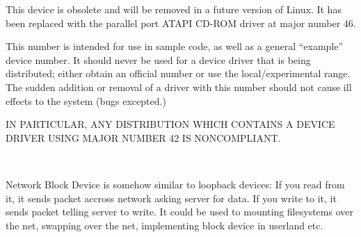 \noindent
This device is obsolete and will be removed in a future version of
Linux.  It has been replaced with the parallel port ATAPI CD-ROM
driver at major number 46.

\begin{devicelist}
\end{devicelist}

\noindent
This number is intended for use in sample code, as well as a general
``example'' device number.  It should never be used for a device
driver that is being distributed; either obtain an official number or
use the local/experimental range.  The sudden addition or removal of a
driver with this number should not cause ill effects to the system
(bugs excepted.)

IN PARTICULAR, ANY DISTRIBUTION WHICH CONTAINS A DEVICE DRIVER USING
MAJOR NUMBER 42 IS NONCOMPLIANT.

\begin{devicelist}
	\minordots
\\
	\minordots
\end{devicelist}

\noindent
Network Block Device is somehow similar to loopback devices: If you
read from it, it sends packet accross network asking server for
data. If you write to it, it sends packet telling server to write. It
could be used to mounting filesystems over the net, swapping over the
net, implementing block device in userland etc.

\begin{devicelist}
	\minordots
\\
        \minordots
\end{devicelist}

